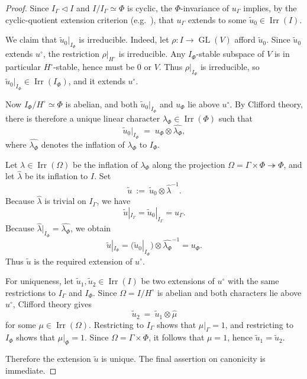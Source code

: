 \documentclass{amsart}
\theoremstyle{plain}
\numberwithin{equation}{section}
\theoremstyle{definition}
\newcommand{\Irr}{\operatorname{Irr}}
\newcommand{\GL}{\operatorname{GL}}
\begin{document}
\begin{proof}
Since \(I_\Gamma\triangleleft I\) and \(I/I_\Gamma\simeq \Phi\) is cyclic, the
\(\Phi\)-invariance of \(u_\Gamma\) implies, by the cyclic-quotient extension criterion
(e.g.\ \cite[Cor.~11.22]{Isaacs}), that \(u_\Gamma\) extends to some
\(\widetilde u_0\in \Irr(I)\).

We claim that \(\widetilde u_0|_{I_\Phi}\) is irreducible. Indeed, let
\(\rho:I\to \GL(V)\) afford \(\widetilde u_0\). Since \(\widetilde u_0\) extends
\(u^\circ\), the restriction \(\rho|_{H^\circ}\) is irreducible. Any \(I_\Phi\)-stable
subspace of \(V\) is in particular \(H^\circ\)-stable, hence must be \(0\) or \(V\).
Thus \(\rho|_{I_\Phi}\) is irreducible, so \(\widetilde u_0|_{I_\Phi}\in \Irr(I_\Phi)\),
and it extends \(u^\circ\).

Now \(I_\Phi/H^\circ\simeq \Phi\) is abelian, and both
\(\widetilde u_0|_{I_\Phi}\) and \(u_\Phi\) lie above \(u^\circ\). By Clifford theory,
there is therefore a unique linear character \(\lambda_\Phi\in \Irr(\Phi)\) such that
\[
\widetilde u_0|_{I_\Phi}
\;=\;
u_\Phi \otimes \widehat{\lambda_\Phi},
\]
where \(\widehat{\lambda_\Phi}\) denotes the inflation of \(\lambda_\Phi\) to \(I_\Phi\).

Let \(\lambda\in \Irr(\Omega)\) be the inflation of \(\lambda_\Phi\) along the projection
\(\Omega=\Gamma\times\Phi\twoheadrightarrow \Phi\), and let \(\widehat\lambda\) be its
inflation to \(I\). Set
\[
\widetilde u \ :=\ \widetilde u_0\otimes \widehat\lambda^{-1}.
\]
Because \(\widehat\lambda\) is trivial on \(I_\Gamma\), we have
\[
\widetilde u|_{I_\Gamma}
=
\widetilde u_0|_{I_\Gamma}
=
u_\Gamma.
\]
Because \(\widehat\lambda|_{I_\Phi}=\widehat{\lambda_\Phi}\), we obtain
\[
\widetilde u|_{I_\Phi}
=
\bigl(\widetilde u_0|_{I_\Phi}\bigr)\otimes \widehat{\lambda_\Phi}^{-1}
=
u_\Phi.
\]
Thus \(\widetilde u\) is the required extension of \(u^\circ\).

For uniqueness, let \(\widetilde u_1,\widetilde u_2\in \Irr(I)\) be two extensions of
\(u^\circ\) with the same restrictions to \(I_\Gamma\) and \(I_\Phi\). Since
\(\Omega=I/H^\circ\) is abelian and both characters lie above \(u^\circ\), Clifford theory
gives
\[
\widetilde u_2 \ =\ \widetilde u_1\otimes \widehat\mu
\]
for some \(\mu\in \Irr(\Omega)\). Restricting to \(I_\Gamma\) shows that
\(\mu|_\Gamma=1\), and restricting to \(I_\Phi\) shows that \(\mu|_\Phi=1\).
Since \(\Omega=\Gamma\times \Phi\), it follows that \(\mu=1\), hence
\(\widetilde u_1=\widetilde u_2\).

Therefore the extension \(\widetilde u\) is unique. The final assertion on canonicity is
immediate.
\end{proof}
\end{document}
